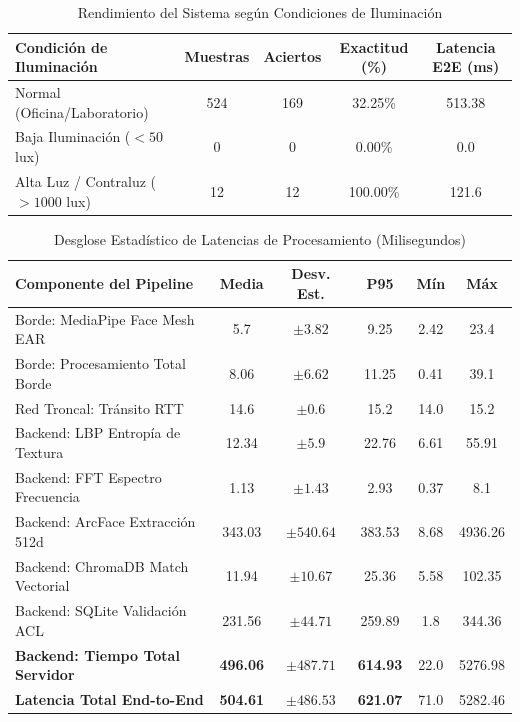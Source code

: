\begin{table}[htbp]
\centering
\caption{Rendimiento del Sistema según Condiciones de Iluminación}
\label{tab:robustez_ambiental}
\begin{tabular}{l|c|c|c|c}
\hline
\textbf{Condición de Iluminación} & \textbf{Muestras} & \textbf{Aciertos} & \textbf{Exactitud (\%)} & \textbf{Latencia E2E (ms)} \\ \hline
Normal (Oficina/Laboratorio) & 524 & 169 & 32.25\% & 513.38 \\
Baja Iluminación ($< 50$ lux) & 0 & 0 & 0.00\% & 0.0 \\
Alta Luz / Contraluz ($> 1000$ lux) & 12 & 12 & 100.00\% & 121.6 \\ \hline
\end{tabular}
\end{table}

\begin{table}[htbp]
\centering
\caption{Desglose Estadístico de Latencias de Procesamiento (Milisegundos)}
\label{tab:latencias_pipeline}
\begin{tabular}{l|c|c|c|c|c}
\hline
\textbf{Componente del Pipeline} & \textbf{Media} & \textbf{Desv. Est.} & \textbf{P95} & \textbf{Mín} & \textbf{Máx} \\ \hline
Borde: MediaPipe Face Mesh EAR & 5.7 & $\pm 3.82$ & 9.25 & 2.42 & 23.4 \\
Borde: Procesamiento Total Borde & 8.06 & $\pm 6.62$ & 11.25 & 0.41 & 39.1 \\
Red Troncal: Tránsito RTT & 14.6 & $\pm 0.6$ & 15.2 & 14.0 & 15.2 \\
Backend: LBP Entropía de Textura & 12.34 & $\pm 5.9$ & 22.76 & 6.61 & 55.91 \\
Backend: FFT Espectro Frecuencia & 1.13 & $\pm 1.43$ & 2.93 & 0.37 & 8.1 \\
Backend: ArcFace Extracción 512d & 343.03 & $\pm 540.64$ & 383.53 & 8.68 & 4936.26 \\
Backend: ChromaDB Match Vectorial & 11.94 & $\pm 10.67$ & 25.36 & 5.58 & 102.35 \\
Backend: SQLite Validación ACL & 231.56 & $\pm 44.71$ & 259.89 & 1.8 & 344.36 \\ \hline
\textbf{Backend: Tiempo Total Servidor} & \textbf{496.06} & $\pm 487.71$ & \textbf{614.93} & 22.0 & 5276.98 \\ \hline
\textbf{Latencia Total End-to-End} & \textbf{504.61} & $\pm 486.53$ & \textbf{621.07} & 71.0 & 5282.46 \\ \hline
\end{tabular}
\end{table}


